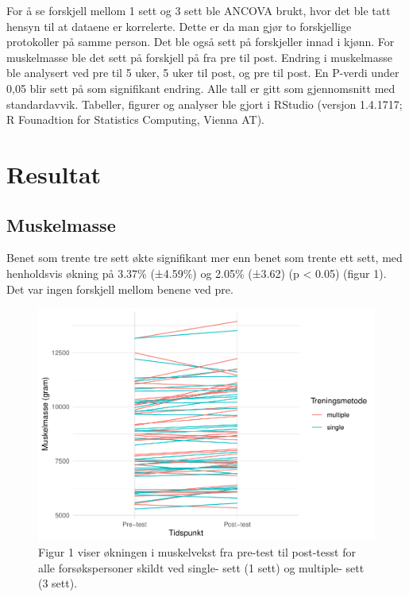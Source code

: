 \documentclass[
]{book}
\newenvironment{Shaded}{\begin{snugshade}}{\end{snugshade}}
\newcommand{\AttributeTok}[1]{\textcolor[rgb]{0.77,0.63,0.00}{#1}}
\newcommand{\ConstantTok}[1]{\textcolor[rgb]{0.00,0.00,0.00}{#1}}
\newcommand{\FunctionTok}[1]{\textcolor[rgb]{0.00,0.00,0.00}{#1}}
\newcommand{\NormalTok}[1]{#1}
\newcommand{\SpecialCharTok}[1]{\textcolor[rgb]{0.00,0.00,0.00}{#1}}
\newcommand{\StringTok}[1]{\textcolor[rgb]{0.31,0.60,0.02}{#1}}
\begin{document}
For å se forskjell mellom 1 sett og 3 sett ble ANCOVA brukt, hvor det ble tatt hensyn til at dataene er korrelerte. Dette er da man gjør to forskjellige protokoller på samme person. Det ble også sett på forskjeller innad i kjønn. For muskelmasse ble det sett på forskjell på fra pre til post. Endring i muskelmasse ble analysert ved pre til 5 uker, 5 uker til post, og pre til post. En P-verdi under 0,05 blir sett på som signifikant endring. Alle tall er gitt som gjennomsnitt med standardavvik. Tabeller, figurer og analyser ble gjort i RStudio (versjon 1.4.1717; R Founadtion for Statistics Computing, Vienna AT).

\hypertarget{resultat-1}{%
\section{Resultat}\label{resultat-1}}

\hypertarget{muskelmasse}{%
\subsection{Muskelmasse}\label{muskelmasse}}

Benet som trente tre sett økte signifikant mer enn benet som trente ett sett, med henholdsvis økning på 3.37\% (±4.59\%) og 2.05\% (±3.62) (p \textless{} 0.05) (figur 1). Det var ingen forskjell mellom benene ved pre.

\begin{Shaded}
\end{Shaded}

\begin{figure}
\centering
\includegraphics{_main_files/figure-latex/figur-1.pdf}
\caption{\label{fig:figur}Figur 1 viser økningen i muskelvekst fra pre-test til post-tesst for alle forsøkspersoner skildt ved single- sett (1 sett) og multiple- sett (3 sett).}
\end{figure}
\end{document}
